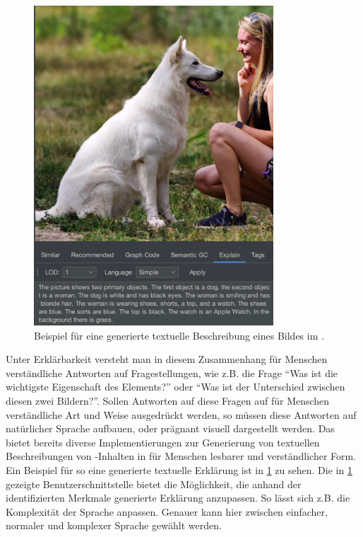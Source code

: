 \begin{figure}[htb]
    \centering
    \includegraphics[width=0.8\textwidth]{resources/images/gmaf-explain-ui-dog-man-example.png}
    \caption{Beispiel für eine generierte textuelle Beschreibung eines Bildes im \gmaf{}.}
    \label{sec1:intro:subsec:motivation:fig:gmaf-explain-ui-dog-man-example}
\end{figure}
\noindent
Unter Erklärbarkeit versteht man in diesem Zusammenhang für Menschen verständliche Antworten auf Fragestellungen, wie z.B. die Frage \enquote{Was ist die wichtigste Eigenschaft des Elements?} oder \enquote{Was ist der Unterschied zwischen diesen zwei Bildern?}.
Sollen Antworten auf diese Fragen auf für Menschen verständliche Art und Weise ausgedrückt werden, so müssen diese Antworten auf natürlicher Sprache aufbauen, oder prägnant visuell dargestellt werden.
Das \gmaf{} bietet bereits diverse Implementierungen zur Generierung von textuellen Beschreibungen von \mmir{}-Inhalten in für Menschen lesbarer und verständlicher Form. 
Ein Beispiel für so eine generierte textuelle Erklärung ist in \cref{sec1:intro:subsec:motivation:fig:gmaf-explain-ui-dog-man-example} zu sehen.
Die in \cref{sec1:intro:subsec:motivation:fig:gmaf-explain-ui-dog-man-example} gezeigte Benutzerschnittstelle bietet die Möglichkeit, die anhand der identifizierten Merkmale generierte Erklärung anzupassen. 
So lässt sich z.B. die Komplexität der Sprache anpassen. 
Genauer kann hier zwischen einfacher, normaler und komplexer Sprache gewählt werden.



